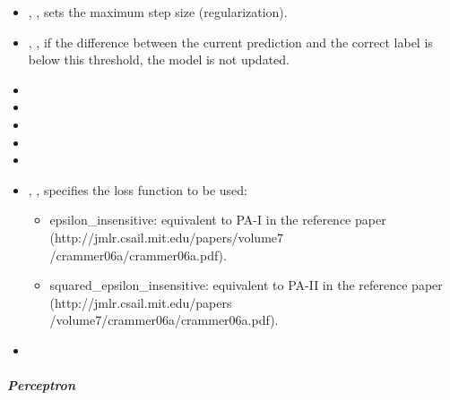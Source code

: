 \begin{itemize}
  \item {}, , sets the maximum step size
  (regularization).
  \item {}, , if the difference between the
  current prediction and the correct label is below this threshold, the model is
  not updated.
  \item {}
  \item {}
  \item {}
  \item {}
  \item \verDescriptionB{}
  \item {}, , specifies the loss
  function to be used:
  \begin{itemize}
    \item epsilon\_insensitive: equivalent to PA-I in the reference paper (http://jmlr.csail.mit.edu/papers/volume7
    /crammer06a/crammer06a.pdf).
    \item squared\_epsilon\_insensitive: equivalent to PA-II in the reference paper (http://jmlr.csail.mit.edu/papers
    /volume7/crammer06a/crammer06a.pdf).
  \end{itemize}
  \item \warmStartDescription{}
\end{itemize}

\subparagraph{Perceptron}
\mbox{}

